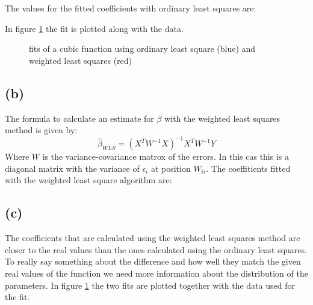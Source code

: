 \documentclass[a4paper]{article}
\begin{document}
The values for the fitted coefficients with ordinary least squares are: 


In figure \ref{fig:fit-3} the fit is plotted along with the data. 
\begin{figure}[H]
	\centering
	
	\caption{fits of a cubic function using ordinary least square (blue) and weighted least squares (red)}
	\label{fig:fit-3}
\end{figure}

\subsection*{(b)}
\noindent {}

The formula to calculate an estimate for $\beta$ with the weighted least squares method is given by:
\begin{equation}
	\hat{\beta}_{WLS} = (X^TW^{-1}X)^{-1} X^TW^{-1}Y
	\label{eq:WLS}
\end{equation}
Where $W$ is the variance-covariance matrox of the errors. In this cas this is a diagonal matrix with the variance of $\epsilon_i$ at position $W_{ii}$. The coeffitients fitted with the weighted least square algorithm are:


\subsection*{(c)}
\noindent {}

The coefficients that are calculated using the weighted least squares method are closer to the real values than the ones calculated using the ordinary least squares. To really say something about the difference and how well they match the given real values of the function we need more information about the distribution of the parameters.
In figure \ref{fig:fit-3} the two fits are plotted together with the data used for the fit.
\end{document}
